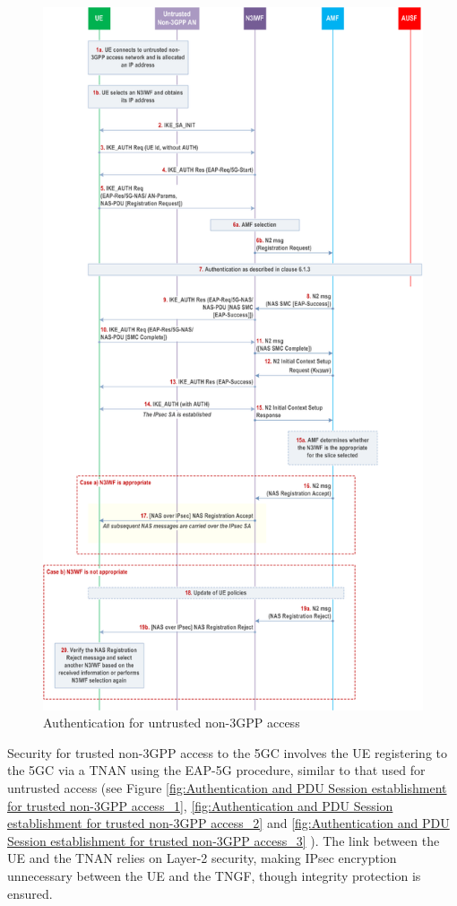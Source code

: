 \begin{figure}
    \centering
    \includegraphics[width=0.75\linewidth]{figs/Authentication for untrusted non-3GPP access.png}
    \caption{Authentication for untrusted non-\ac{3GPP} access}
    \label{fig:Authentication for untrusted non-3GPP access}
\end{figure}

Security for trusted non-\ac{3GPP} access to the \ac{5GC} involves the \ac{UE} registering to the \ac{5GC} via a \ac{TNAN} using the \ac{EAP-5G} procedure, similar to that used for untrusted access (see Figure \ref{fig:Authentication and PDU Session establishment for trusted non-3GPP access_1}, \ref{fig:Authentication and PDU Session establishment for trusted non-3GPP access_2} and \ref{fig:Authentication and PDU Session establishment for trusted non-3GPP access_3} ). The link between the \ac{UE} and the \ac{TNAN} relies on Layer-2 security, making \ac{IPsec} encryption unnecessary between the \ac{UE} and the \ac{TNGF}, though integrity protection is ensured.


